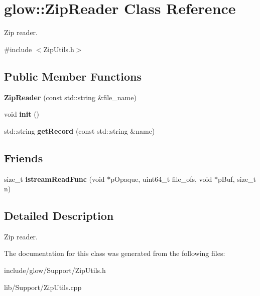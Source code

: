 \hypertarget{classglow_1_1_zip_reader}{}\section{glow\+:\+:Zip\+Reader Class Reference}
\label{classglow_1_1_zip_reader}


Zip reader.  




{\ttfamily \#include $<$Zip\+Utils.\+h$>$}

\subsection*{Public Member Functions}
\begin{DoxyCompactItemize}
\item 
\mbox{\label{classglow_1_1_zip_reader_a135bb48eaa3f7d019b9f2312912685d7}} 
{\bfseries Zip\+Reader} (const std\+::string \&file\+\_\+name)
\item 
\mbox{\label{classglow_1_1_zip_reader_ac06103de49bb31707f746c80b9086ec6}} 
void {\bfseries init} ()
\item 
\mbox{\label{classglow_1_1_zip_reader_a1f6d32d9849e41c4e933cd9b4e11b7c9}} 
std\+::string {\bfseries get\+Record} (const std\+::string \&name)
\end{DoxyCompactItemize}
\subsection*{Friends}
\begin{DoxyCompactItemize}
\item 
\mbox{\label{classglow_1_1_zip_reader_afd33058481c7782232dd8832ea196a8f}} 
size\+\_\+t {\bfseries istream\+Read\+Func} (void $\ast$p\+Opaque, uint64\+\_\+t file\+\_\+ofs, void $\ast$p\+Buf, size\+\_\+t n)
\end{DoxyCompactItemize}


\subsection{Detailed Description}
Zip reader. 

The documentation for this class was generated from the following files\+:\begin{DoxyCompactItemize}
\item 
include/glow/\+Support/Zip\+Utils.\+h\item 
lib/\+Support/Zip\+Utils.\+cpp\end{DoxyCompactItemize}
